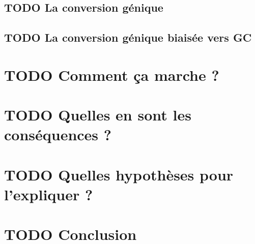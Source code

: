 \documentclass[11pt]{scrartcl}
\begin{document}
\subsection{{\bfseries\sffamily TODO} La conversion génique}
\label{sec-2-2}
\subsection{{\bfseries\sffamily TODO} La conversion génique biaisée vers GC}
\label{sec-2-3}
\section{{\bfseries\sffamily TODO} Comment ça marche ?}
\label{sec-3}
\section{{\bfseries\sffamily TODO} Quelles en sont les conséquences ?}
\label{sec-4}
\section{{\bfseries\sffamily TODO} Quelles hypothèses pour l'expliquer ?}
\label{sec-5}
\section{{\bfseries\sffamily TODO} Conclusion}
\label{sec-6}

\linespread{0.8}

\end{document}
